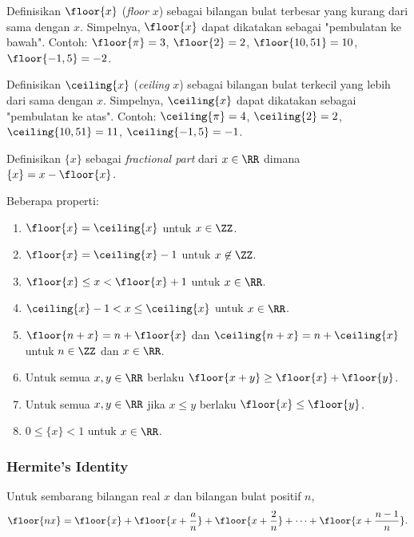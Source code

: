 Definisikan $\floor{x}$ (\textit{floor} $x$) sebagai bilangan bulat terbesar yang kurang dari sama dengan $x$. Simpelnya, $\floor{x}$ dapat dikatakan sebagai "pembulatan ke bawah". Contoh: $\floor{\pi}=3$, $\floor{2}=2$, $\floor{10,51}=10$, $\floor{-1,5}=-2$.

Definisikan $\ceiling{x}$ (\textit{ceiling} $x$) sebagai bilangan bulat terkecil yang lebih dari sama dengan $x$. Simpelnya, $\ceiling{x}$ dapat dikatakan sebagai "pembulatan ke atas". Contoh: $\ceiling{\pi}=4$, $\ceiling{2}=2$, $\ceiling{10,51}=11$, $\ceiling{-1,5}=-1$.

Definisikan $\{x\}$ sebagai \textit{fractional part} dari $x \in \RR$ dimana $\{x\} = x - \floor{x}$.

Beberapa properti:
\begin{enumerate}
    \item $\floor{x}=\ceiling{x}$ untuk $x \in \ZZ$.
    \item $\floor{x}=\ceiling{x}-1$ untuk $x \not \in \ZZ$.
    \item $\floor{x} \le  x < \floor{x}+1$ untuk $x \in \RR$.
    \item $\ceiling{x}-1 < x \le \ceiling{x}$ untuk $x \in \RR$.
    \item $\floor{n+x}=n+\floor{x}$ dan $\ceiling{n+x}=n+\ceiling{x}$ untuk $n\in \ZZ$ dan $x \in \RR$.
    \item Untuk semua $x,y \in \RR$ berlaku $\floor{x+y} \ge \floor{x}+\floor{y}$.
    \item Untuk semua $x,y \in \RR$ jika $x \le y$ berlaku $\floor{x} \le \floor{y}$.
    \item $0 \le \{x\} < 1$ untuk $x \in \RR$.
\end{enumerate}
\subsubsection{Hermite's Identity}
Untuk sembarang bilangan real $x$ dan bilangan bulat positif $n$,
$$\floor{nx}=\floor{x}+\floor{x+\dfrac{a}{n}}+\floor{x+\dfrac{2}{n}}+\dots+\floor{x+\dfrac{n-1}{n}}.$$
